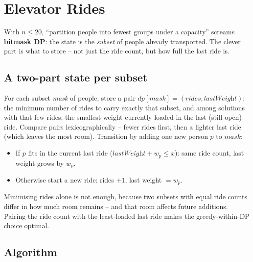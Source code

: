 \section{Elevator Rides}
\label{sec:cses-elevator-rides}


\begin{patternbox}
With $n\le20$, ``partition people into fewest groups under a capacity''
screams \textbf{bitmask DP}: the state is the \emph{subset} of people
already transported. The clever part is what to store -- not just the ride
count, but how full the last ride is.
\end{patternbox}

\subsection*{A two-part state per subset}

For each subset \textit{mask} of people, store a pair
$\textit{dp}[\textit{mask}]=(\textit{rides},\textit{lastWeight})$: the
minimum number of rides to carry exactly that subset, and among solutions
with that few rides, the smallest weight currently loaded in the last
(still-open) ride. Compare pairs lexicographically -- fewer rides first,
then a lighter last ride (which leaves the most room). Transition by adding
one new person $p$ to $\textit{mask}$:
\begin{itemize}
  \item If $p$ fits in the current last ride
        ($\textit{lastWeight}+w_p\le x$): same ride count, last weight
        grows by $w_p$.
  \item Otherwise start a new ride: rides $+1$, last weight $=w_p$.
\end{itemize}

\begin{ideabox}
Minimising rides alone is not enough, because two subsets with equal ride
counts differ in how much room remains -- and that room affects future
additions. Pairing the ride count with the least-loaded last ride makes
the greedy-within-DP choice optimal.
\end{ideabox}

\subsection*{Algorithm}

